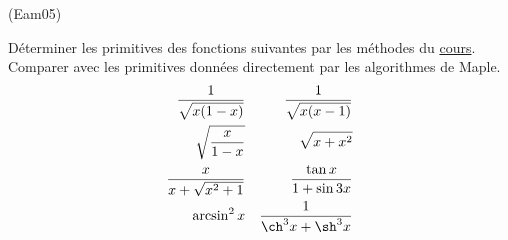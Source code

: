 \begin{tiny}(Eam05)\end{tiny}
Déterminer les primitives des fonctions suivantes par les méthodes du \href{http://back.maquisdoc.net.data/cours_nicolair/C2198.pdf}{cours}. Comparer avec les primitives données directement par les algorithmes de Maple.
\begin{align*}
 \dfrac{1}{\sqrt{x(1-x)}} & & \dfrac{1}{\sqrt{x(x-1)}} \\
\sqrt{\dfrac{x}{1-x}} & & \sqrt{x+x^2}\\
\dfrac{x}{x+\sqrt{x^2+1}} & & \dfrac{\tan x}{1+\sin 3x} \\
\arcsin^2x & & \dfrac{1}{\ch^3 x + \sh^3 x}
\end{align*}
